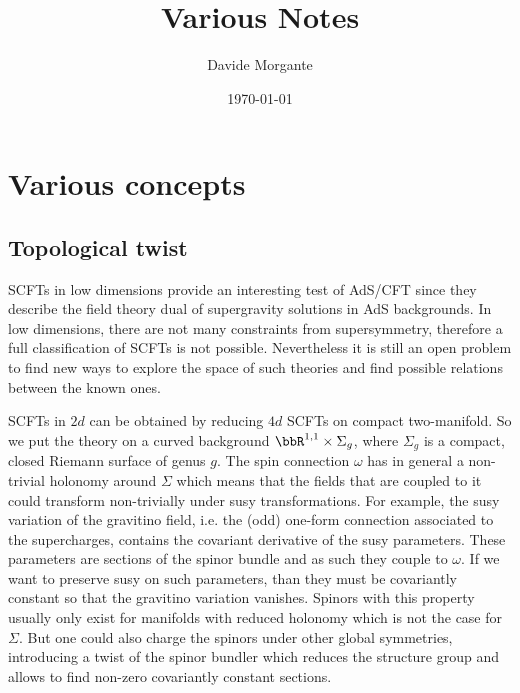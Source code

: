 \documentclass[11pt]{book}
\title{\vspace{1cm}\bf{Various Notes}\vspace{0.2cm}}
\date{\vspace{0.2cm} \today}
\author{Davide Morgante}
\theoremstyle{definition}
\numberwithin{equation}{section}
\begin{document}
\allowdisplaybreaks
\maketitle

\setcounter{page}{1}
{\hypersetup{linkcolor=orange}
\tableofcontents
}
\mainmatter










\chapter{Various concepts}
\section{Topological twist}
SCFTs in low dimensions provide an interesting test of AdS/CFT since they describe the field theory dual of supergravity solutions in AdS backgrounds. In low dimensions, there are not many constraints from supersymmetry, therefore a full classification of SCFTs is not possible. Nevertheless it is still an open problem to find new ways to explore the space of such theories and find possible relations between the known ones.

SCFTs in $2d$ can be obtained by reducing $4d$ SCFTs on compact two-manifold. So we put the theory on a curved background $\bbR^{1,1}\times\Sigma_g$, where $\Sigma_g$ is a compact, closed Riemann surface of genus $g$. The spin connection $\omega$ has in general a non-trivial holonomy around $\Sigma$ which means that the fields that are coupled to it could transform non-trivially under susy transformations. For example, the susy variation of the gravitino field, i.e. the (odd) one-form connection associated to the supercharges, contains the covariant derivative of the susy parameters. These parameters are sections of the spinor bundle and as such they couple to $\omega$. If we want to preserve susy on such parameters, than they must be covariantly constant so that the gravitino variation vanishes. Spinors with this property usually only exist for manifolds with reduced holonomy which is not the case for $\Sigma$. But one could also charge the spinors under other global symmetries, introducing a twist of the spinor bundler which reduces the structure group and allows to find non-zero covariantly constant sections. 
\end{document}
